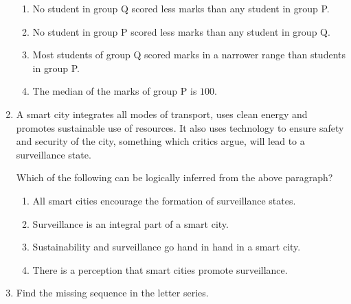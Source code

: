 \documentclass[journal]{IEEEtran}
\begin{document}
\begin{enumerate}[leftmargin=0pt]
  \begin{enumerate}
\item No student in group Q scored less marks than any student in group P.
      \item No student in group P scored less marks than any student in group Q.
      \item Most students of group Q scored marks in a narrower range than students in group P.
      \item The median of the marks of group P is $100$.
  \end{enumerate}

  \hfill{}



\item A smart city integrates all modes of transport, uses clean energy and promotes sustainable use of resources. It also uses technology to ensure safety and security of the city, something which critics argue, will lead to a surveillance state.

\vspace{0.5em}

Which of the following can be logically inferred from the above paragraph?
\begin{enumerate}[label=(\roman*)]
\item All smart cities encourage the formation of surveillance states.
  \item Surveillance is an integral part of a smart city.
  \item Sustainability and surveillance go hand in hand in a smart city.
  \item There is a perception that smart cities promote surveillance.
\end{enumerate}

\begin{enumerate}
\end{enumerate}

\hfill{}


\item Find the missing sequence in the letter series.


\end{enumerate}
\end{document}
